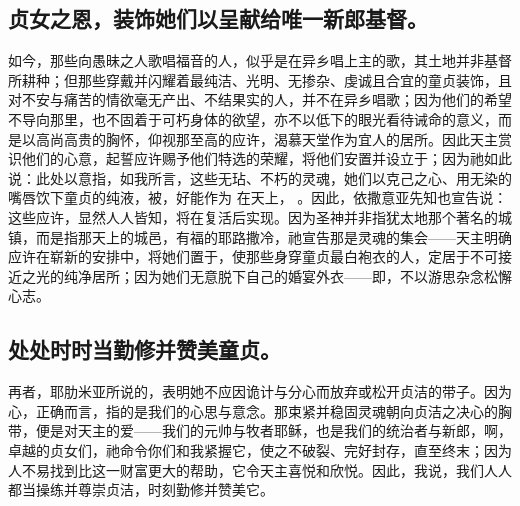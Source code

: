 
\subsection{贞女之恩，装饰她们以呈献给唯一新郎基督。}

如今，那些向愚昧之人歌唱福音的人，似乎是在异乡唱上主的歌，其土地并非基督所耕种；但那些穿戴并闪耀着最纯洁、光明、无掺杂、虔诚且合宜的童贞装饰，且对不安与痛苦的情欲毫无产出、不结果实的人，并不在异乡唱歌；因为他们的希望不导向那里，也不固着于可朽身体的欲望，亦不以低下的眼光看待诫命的意义，而是以高尚高贵的胸怀，仰视那至高的应许，渴慕天堂作为宜人的居所。因此天主赏识他们的心意，起誓应许赐予他们特选的荣耀，将他们安置并设立于；因为祂如此说：此处以意指，如我所言，这些无玷、不朽的灵魂，她们以克己之心、用无染的嘴唇饮下童贞的纯液，被，好能作为 在天上， 。因此，依撒意亚先知也宣告说： 这些应许，显然人人皆知，将在复活后实现。因为圣神并非指犹太地那个著名的城镇，而是指那天上的城邑，有福的耶路撒冷，祂宣告那是灵魂的集会——天主明确应许在崭新的安排中，将她们置于，使那些身穿童贞最白袍衣的人，定居于不可接近之光的纯净居所；因为她们无意脱下自己的婚宴外衣——即，不以游思杂念松懈心志。\newline{}\par


\subsection{处处时时当勤修并赞美童贞。}

再者，耶肋米亚所说的，表明她不应因诡计与分心而放弃或松开贞洁的带子。因为心，正确而言，指的是我们的心思与意念。那束紧并稳固灵魂朝向贞洁之决心的胸带，便是对天主的爱——我们的元帅与牧者耶稣，也是我们的统治者与新郎，啊，卓越的贞女们，祂命令你们和我紧握它，使之不破裂、完好封存，直至终末；因为人不易找到比这一财富更大的帮助，它令天主喜悦和欣悦。因此，我说，我们人人都当操练并尊崇贞洁，时刻勤修并赞美它。\newline{}\par


